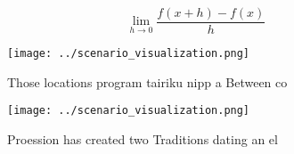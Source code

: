 \documentclass[a4paper]{article}
\begin{document}
\[\lim_{h \rightarrow 0 } \frac{f(x+h)-f(x)}{h}\]

\begin{figure}
\centering
\texttt{[image: ../scenario\_visualization.png]}
\caption{Those locations program tairiku nipp a Between co
}
\end{figure}
 
\begin{figure}
\centering
\texttt{[image: ../scenario\_visualization.png]}
\caption{Proession has created two Traditions dating an el
}
\end{figure}
 
\end{document}
